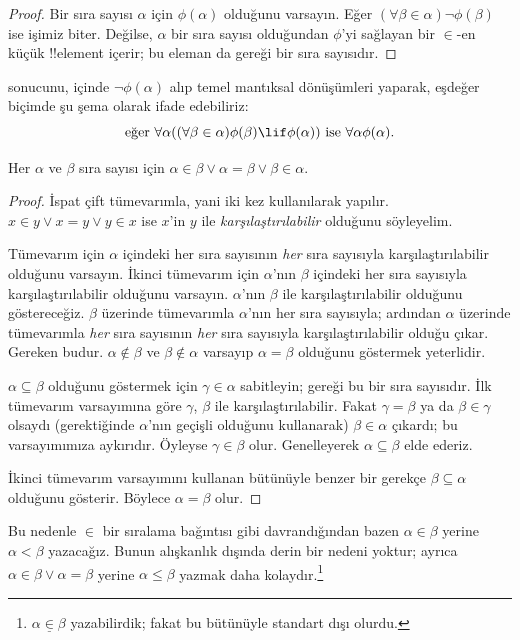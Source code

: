 \begin{proof}
Bir sıra sayısı $\alpha$ için $\phi(\alpha)$ olduğunu varsayın. Eğer
$(\forall\beta\in\alpha)\lnot\phi(\beta)$ ise işimiz biter. Değilse,
$\alpha$ bir sıra sayısı olduğundan $\phi$'yi sağlayan bir $\in$-en küçük
!!{element} içerir; bu eleman da  gereği bir sıra
sayısıdır.
\end{proof}
\noindent
{} sonucunu,  içinde
$\lnot\phi(\alpha)$ alıp temel mantıksal dönüşümleri yaparak, eşdeğer biçimde
şu şema olarak ifade edebiliriz:
\[
\text{eğer }\forall \alpha((\forall \beta \in \alpha)\phi(\beta) \lif
\phi(\alpha))\text{ ise }\forall \alpha\phi(\alpha).
\]

\begin{thm}
Her $\alpha$ ve $\beta$ sıra sayısı için
$\alpha\in\beta\lor\alpha=\beta\lor\beta\in\alpha$.
\end{thm}

\begin{proof}
İspat çift tümevarımla, yani  iki kez kullanılarak
yapılır. $x\in y\lor x=y\lor y\in x$ ise $x$'in $y$ ile
\emph{karşılaştırılabilir} olduğunu söyleyelim.

Tümevarım için $\alpha$ içindeki her sıra sayısının \emph{her} sıra
sayısıyla karşılaştırılabilir olduğunu varsayın. İkinci tümevarım için
$\alpha$'nın $\beta$ içindeki her sıra sayısıyla karşılaştırılabilir
olduğunu varsayın. $\alpha$'nın $\beta$ ile karşılaştırılabilir olduğunu
göstereceğiz. $\beta$ üzerinde tümevarımla $\alpha$'nın her sıra sayısıyla;
ardından $\alpha$ üzerinde tümevarımla \emph{her} sıra sayısının \emph{her}
sıra sayısıyla karşılaştırılabilir olduğu çıkar. Gereken budur.
$\alpha\notin\beta$ ve $\beta\notin\alpha$ varsayıp $\alpha=\beta$
olduğunu göstermek yeterlidir.

$\alpha\subseteq\beta$ olduğunu göstermek için $\gamma\in\alpha$
sabitleyin;  gereği bu bir sıra sayısıdır. İlk tümevarım
varsayımına göre $\gamma$, $\beta$ ile karşılaştırılabilir. Fakat
$\gamma=\beta$ ya da $\beta\in\gamma$ olsaydı (gerektiğinde $\alpha$'nın
geçişli olduğunu kullanarak) $\beta\in\alpha$ çıkardı; bu varsayımımıza
aykırıdır. Öyleyse $\gamma\in\beta$ olur. Genelleyerek
$\alpha\subseteq\beta$ elde ederiz.

İkinci tümevarım varsayımını kullanan bütünüyle benzer bir gerekçe
$\beta\subseteq\alpha$ olduğunu gösterir. Böylece $\alpha=\beta$ olur.
\end{proof}\noindent
Bu nedenle $\in$ bir sıralama bağıntısı gibi davrandığından bazen
$\alpha\in\beta$ yerine $\alpha<\beta$ yazacağız. Bunun alışkanlık dışında
derin bir nedeni yoktur; ayrıca $\alpha\in\beta\lor\alpha=\beta$ yerine
$\alpha\leq\beta$ yazmak daha kolaydır.\footnote{$\alpha
\mathrel{\underline{\in}}\beta$ yazabilirdik; fakat bu bütünüyle standart
dışı olurdu.}

